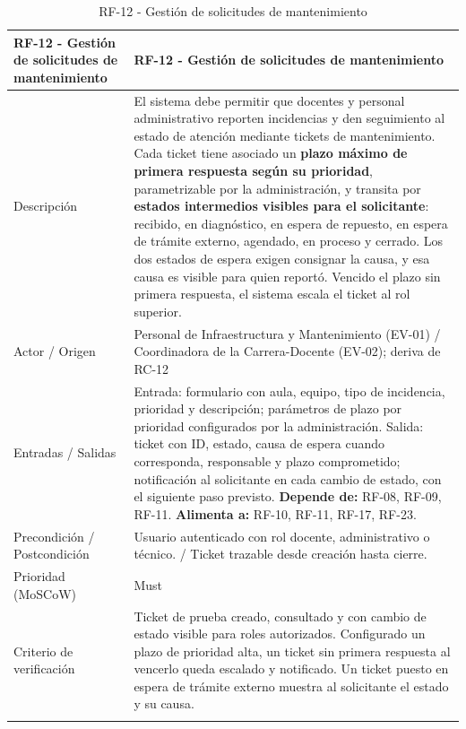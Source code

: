 \begingroup
\small
\begin{longtable}{|P{0.5000}|P{0.5000}|}
\hline
RF-12 - Gestión de solicitudes de mantenimiento & RF-12 - Gestión de solicitudes de mantenimiento \\ \hline
Descripción & El sistema debe permitir que docentes y personal administrativo reporten incidencias y den seguimiento al estado de atención mediante tickets de mantenimiento. Cada ticket tiene asociado un \textbf{plazo máximo de primera respuesta según su prioridad}, parametrizable por la administración, y transita por \textbf{estados intermedios visibles para el solicitante}: recibido, en diagnóstico, en espera de repuesto, en espera de trámite externo, agendado, en proceso y cerrado. Los dos estados de espera exigen consignar la causa, y esa causa es visible para quien reportó. Vencido el plazo sin primera respuesta, el sistema escala el ticket al rol superior. \\ \hline
Actor / Origen & Personal de Infraestructura y Mantenimiento (EV-01) / Coordinadora de la Carrera-Docente (EV-02); deriva de RC-12 \\ \hline
Entradas / Salidas & Entrada: formulario con aula, equipo, tipo de incidencia, prioridad y descripción; parámetros de plazo por prioridad configurados por la administración. Salida: ticket con ID, estado, causa de espera cuando corresponda, responsable y plazo comprometido; notificación al solicitante en cada cambio de estado, con el siguiente paso previsto. \textbf{Depende de:} RF-08, RF-09, RF-11. \textbf{Alimenta a:} RF-10, RF-11, RF-17, RF-23. \\ \hline
Precondición / Postcondición & Usuario autenticado con rol docente, administrativo o técnico. / Ticket trazable desde creación hasta cierre. \\ \hline
Prioridad (MoSCoW) & Must \\ \hline
Criterio de verificación & Ticket de prueba creado, consultado y con cambio de estado visible para roles autorizados. Configurado un plazo de prioridad alta, un ticket sin primera respuesta al vencerlo queda escalado y notificado. Un ticket puesto en espera de trámite externo muestra al solicitante el estado y su causa. \\ \hline
\caption{RF-12 - Gestión de solicitudes de mantenimiento}
\end{longtable}
\endgroup


